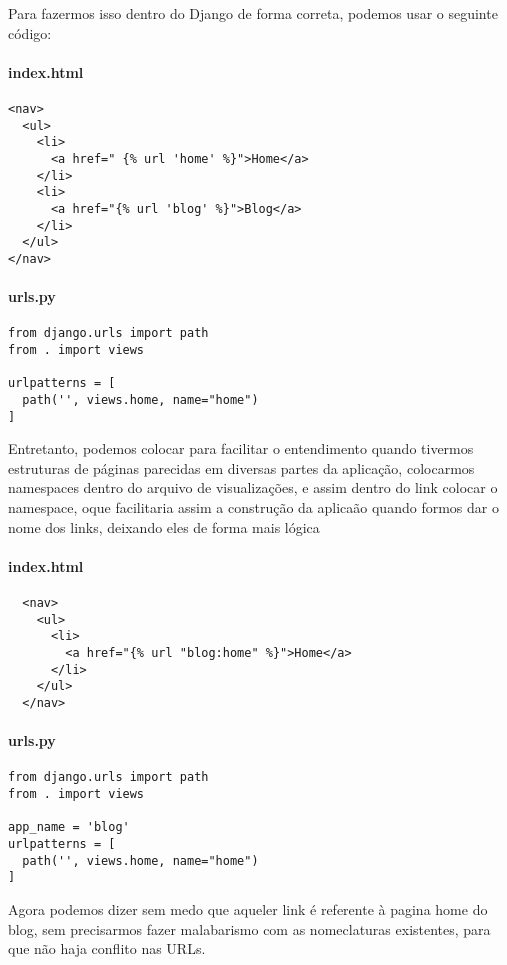 \documentclass[12pt, a4paper]{paper}
\begin{document}
Para fazermos isso dentro do Django de forma correta, podemos usar o seguinte código: 


\paragraph{index.html} %
\label{par:index.html} 
\begin{verbatim}
<nav>
  <ul>
    <li>
      <a href=" {% url 'home' %}">Home</a>
    </li>
    <li>
      <a href="{% url 'blog' %}">Blog</a>
    </li>
  </ul>
</nav>
\end{verbatim}

\paragraph{urls.py} %
\label{par:urls.py}
\begin{verbatim}
from django.urls import path
from . import views 

urlpatterns = [
  path('', views.home, name="home")
]
\end{verbatim}

Entretanto, podemos colocar para facilitar o entendimento quando tivermos estruturas 
de páginas parecidas em diversas partes da aplicação, colocarmos namespaces dentro do 
arquivo de visualizações, e assim dentro do link colocar o namespace, oque facilitaria 
assim a construção da aplicaão quando formos dar o nome dos links, deixando eles de 
forma mais lógica

\paragraph{index.html} %
\label{par:index.html}
\begin{verbatim}
  <nav>
    <ul>
      <li>
        <a href="{% url "blog:home" %}">Home</a>
      </li>
    </ul>
  </nav>
\end{verbatim}

\paragraph{urls.py} %
\label{par:urls.py}
\begin{verbatim}
from django.urls import path
from . import views

app_name = 'blog'
urlpatterns = [
  path('', views.home, name="home")
]
\end{verbatim}


Agora podemos dizer sem medo que aqueler link é referente à pagina home do blog, 
sem precisarmos fazer malabarismo com as nomeclaturas existentes, para que não haja 
conflito nas URLs. 
\end{document}
